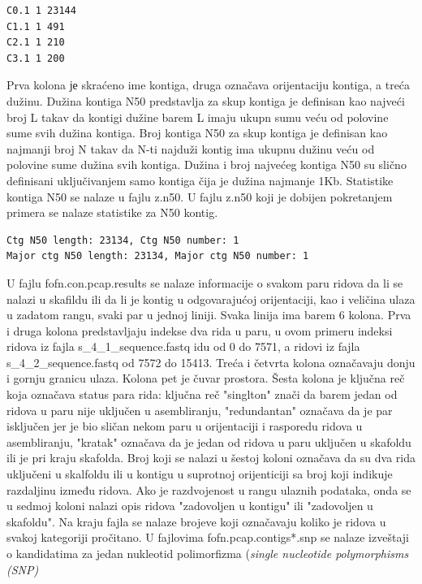 \documentclass[a4paper]{article}
\begin{document}
{\begin{verbatim}
C0.1 1 23144 
C1.1 1 491 
C2.1 1 210 
C3.1 1 200 
\end{verbatim}
Prva kolona је skraćeno ime kontiga, druga označava orijentaciju kontiga, a treća dužinu. Dužina kontiga N50 predstavlja za skup kontiga je definisan kao najveći broj L takav da kontigi dužine barem L imaju ukupn sumu veću od polovine sume svih dužina kontiga. Broj kontiga N50 za skup kontiga je definisan kao najmanji broj N takav da N-ti najduži kontig ima ukupnu dužinu veću od polovine sume dužina svih kontiga. Dužina i broj najvećeg kontiga N50 su slično definisani uključivanjem samo kontiga čija je dužina najmanje 1Kb. Statistike kontiga N50 se nalaze u fajlu z.n50. U fajlu z.n50 koji je dobijen pokretanjem primera se nalaze statistike za N50 kontig.
\begin{verbatim}
Ctg N50 length: 23134, Ctg N50 number: 1
Major ctg N50 length: 23134, Major ctg N50 number: 1
\end{verbatim}

U fajlu fofn.con.pcap.results se nalaze informacije o svakom paru ridova da li se nalazi u skafildu ili da li je kontig u odgovarajućoj orijentaciji, kao i veličina ulaza u zadatom rangu, svaki par u jednoj liniji. Svaka linija ima barem 6 kolona. Prva i druga kolona predstavljaju indekse dva rida u paru, u ovom primeru indeksi ridova iz fajla s\_4\_1\_sequence.fastq idu od 0 do 7571, a ridovi iz fajla s\_4\_2\_sequence.fastq  od 7572 do 15413. Treća i četvrta kolona označavaju donju i gornju granicu ulaza. Kolona pet je čuvar prostora. Šesta kolona je ključna reč koja označava status para rida: ključna reč "singlton" znači da barem jedan od ridova u paru nije uključen u asembliranju, "redundantan" označava da je par isključen jer je bio sličan nekom paru u orijentaciji i rasporedu ridova u asembliranju, "kratak" označava da je jedan od ridova u paru uključen u skafoldu ili je pri kraju skafolda. Broj koji se nalazi u šestoj koloni označava da su dva rida uključeni u skalfoldu ili u kontigu u suprotnoj orijenticiji sa broj koji indikuje razdaljinu između ridova. Ako je razdvojenost u rangu ulaznih podataka, onda se u sedmoj koloni nalazi opis ridova "zadovoljen u kontigu" ili "zadovoljen u skafoldu". Na kraju fajla se nalaze brojeve koji označavaju koliko je ridova u svakoj kategoriji pročitano. U fajlovima fofn.pcap.contigs*.snp se nalaze izveštaji o kandidatima za jedan nukleotid polimorfizma (\textit{single nucleotide polymorphisms (SNP)}



}
\end{document}
